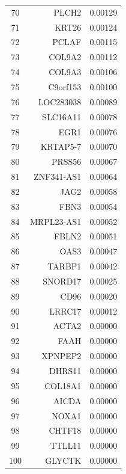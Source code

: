 \begin{longtable}{crr}
70 & PLCH2 & 0.00129 \\
71 & KRT26 & 0.00124 \\
72 & PCLAF & 0.00115 \\
73 & COL9A2 & 0.00112 \\
74 & COL9A3 & 0.00106 \\
75 & C9orf153 & 0.00100 \\
76 & LOC283038 & 0.00089 \\
77 & SLC16A11 & 0.00078 \\
78 & EGR1 & 0.00076 \\
79 & KRTAP5-7 & 0.00070 \\
80 & PRSS56 & 0.00067 \\
81 & ZNF341-AS1 & 0.00064 \\
82 & JAG2 & 0.00058 \\
83 & FBN3 & 0.00054 \\
84 & MRPL23-AS1 & 0.00052 \\
85 & FBLN2 & 0.00051 \\
86 & OAS3 & 0.00047 \\
87 & TARBP1 & 0.00042 \\
88 & SNORD17 & 0.00025 \\
89 & CD96 & 0.00020 \\
90 & LRRC17 & 0.00012 \\
91 & ACTA2 & 0.00000 \\
92 & FAAH & 0.00000 \\
93 & XPNPEP2 & 0.00000 \\
94 & DHRS11 & 0.00000 \\
95 & COL18A1 & 0.00000 \\
96 & AICDA & 0.00000 \\
97 & NOXA1 & 0.00000 \\
98 & CHTF18 & 0.00000 \\
99 & TTLL11 & 0.00000 \\
100 & GLYCTK & 0.00000 \\
\end{longtable}
